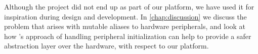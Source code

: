 Although the {\zinc} project did not end up as part of our platform, we have used it for inspiration during design and development.
In \autoref{chap:discussion} we discuss the problem that arises with mutable aliases to hardware peripherals, and look at how {\zinc}'s approach of handling peripheral initialization can help to provide a safer abstraction layer over the hardware, with respect to our platform.

